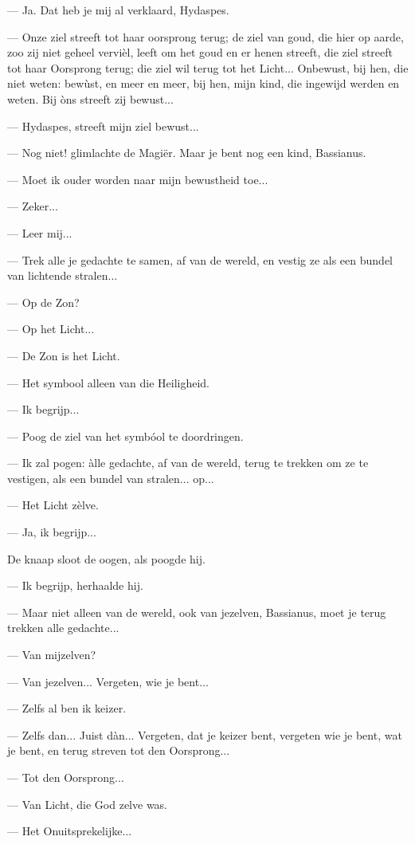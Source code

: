\documentclass[a4paper, 12pt, oneside, dutch]{article}
\begin{document}
--- Ja. Dat heb je mij al verklaard, Hydaspes.

--- Onze ziel streeft tot haar oorsprong terug; de ziel van goud, die hier op aarde, zoo zij niet geheel vervièl, leeft om het goud en er henen streeft, die ziel streeft tot haar Oorsprong terug; die ziel wil terug tot het Licht... Onbewust, bij hen, die niet weten: bewùst, en meer en meer, bij hen, mijn kind, die ingewijd werden en weten. Bij òns streeft zij bewust...

--- Hydaspes, streeft mijn ziel bewust...

--- Nog niet! glimlachte de Magiër. Maar je bent nog een kind, Bassianus.

--- Moet ik ouder worden naar mijn bewustheid toe...

--- Zeker...

--- Leer mij...

--- Trek alle je gedachte te samen, af van de wereld, en vestig ze als een bundel van lichtende stralen...

--- Op de Zon?

--- Op het Licht...

--- De Zon is het Licht.

--- Het symbool alleen van die Heiligheid.

--- Ik begrijp...

--- Poog de ziel van het symbóol te doordringen.

--- Ik zal pogen: àlle gedachte, af van de wereld, terug te trekken om ze te vestigen, als een bundel van stralen... op...

--- Het Licht zèlve.

--- Ja, ik begrijp...

De knaap sloot de oogen, als poogde hij.

--- Ik begrijp, herhaalde hij.

--- Maar niet alleen van de wereld, ook van jezelven, Bassianus, moet je terug trekken alle gedachte...

--- Van mijzelven?

--- Van jezelven... Vergeten, wie je bent...

--- Zelfs al ben ik keizer.

--- Zelfs dan... Juist dàn... Vergeten, dat je keizer bent, vergeten wie je bent, wat je bent, en terug streven tot den Oorsprong...

--- Tot den Oorsprong...

--- Van Licht, die God zelve was.

--- Het Onuitsprekelijke...
\end{document}

